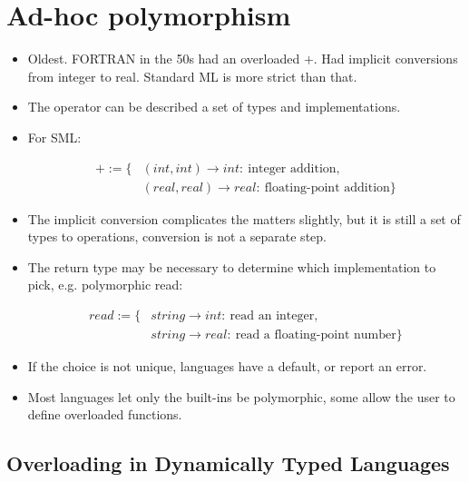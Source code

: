 \section{Ad-hoc polymorphism}

\begin{itemize}

\item Oldest. FORTRAN in the 50s had an overloaded $+$. Had implicit
conversions from integer to real. Standard ML is more strict than that.

\item The operator can be described a set of types and implementations.

\item For SML:

\begin{align}
+:=\{&(int,int) \rightarrow int:\ \text{integer addition},\\
  & (real,real) \rightarrow real:\ \text{floating-point addition}\}
\end{align}

\item The implicit conversion complicates the matters slightly, but it is still
a set of types to operations, conversion is not a separate step.

\item The return type may be necessary to determine which implementation to
pick, e.g. polymorphic read:

\begin{align}
read:=\{& string \rightarrow int:\ \text{read an integer}, \\
  & string \rightarrow real:\ \text{read a floating-point number}\}
\end{align}

\item If the choice is not unique, languages have a default, or report an
error.

\item Most languages let only the built-ins be polymorphic, some allow the user
to define overloaded functions.

\end{itemize}

\subsection{Overloading in Dynamically Typed Languages}

